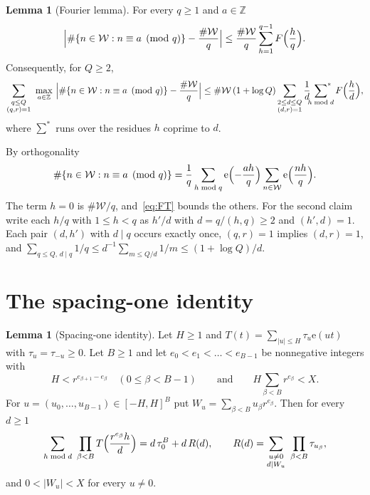 \documentclass[11pt]{amsart}
\makeatletter
\theoremstyle{definition}
\newtheorem{lemma}[theorem]{Lemma}
\numberwithin{equation}{section}
\renewenvironment{proof}[1][\proofname]{\par\pushQED{\qed}\normalfont\topsep6\p@\@plus6\p@\relax\trivlist\item[\hskip\labelsep\upshape#1.]\ignorespaces}{\popQED\endtrivlist\@endpefalse}
\newcommand{\e}{\mathrm{e}}
\newcommand{\Z}{\mathbb{Z}}
\newcommand{\WW}{\mathcal{W}}
\newcommand{\sumstar}{\sideset{}{^*}\sum}
\makeatother
\begin{document}
\begin{lemma}[Fourier lemma]\label{lem:fourier}
For every $q\ge1$ and $a\in\Z$
\[
\Bigl|\#\{n\in\WW:n\equiv a\pmod q\}-\frac{\#\WW}{q}\Bigr|\le\frac{\#\WW}{q}\sum_{h=1}^{q-1}F\Bigl(\frac hq\Bigr).
\]
Consequently, for $Q\ge2$,
\[
\sum_{\substack{q\le Q\\(q,r)=1}}\ \max_{a\in\Z}\ \Bigl|\#\{n\in\WW:n\equiv a\pmod q\}-\frac{\#\WW}{q}\Bigr|\le\#\WW\,(1+\log Q)\sum_{\substack{2\le d\le Q\\(d,r)=1}}\frac1d\sumstar_{h\bmod d}F\Bigl(\frac hd\Bigr),
\]
where $\sum^*$ runs over the residues $h$ coprime to $d$.
\end{lemma}

\begin{proof}
By orthogonality
\[
\#\{n\in\WW:n\equiv a\pmod q\}=\frac1q\sum_{h\bmod q}\e\Bigl(-\frac{ah}q\Bigr)\sum_{n\in\WW}\e\Bigl(\frac{nh}q\Bigr).
\]
The term $h=0$ is $\#\WW/q$, and~\eqref{eq:FT} bounds the others. For the second claim write each $h/q$ with $1\le h<q$ as $h'/d$ with $d=q/(h,q)\ge2$ and $(h',d)=1$. Each pair $(d,h')$ with $d\mid q$ occurs exactly once, $(q,r)=1$ implies $(d,r)=1$, and $\sum_{q\le Q,\,d\mid q}1/q\le d^{-1}\sum_{m\le Q/d}1/m\le(1+\log Q)/d$.
\end{proof}

\section{The spacing-one identity}\label{sec:identity}

\begin{lemma}[Spacing-one identity]\label{lem:identity}
Let $H\ge1$ and $T(t)=\sum_{\lvert u\rvert\le H}\tau_u\e(ut)$ with $\tau_u=\tau_{-u}\ge0$. Let $B\ge1$ and let $e_0<e_1<\dots<e_{B-1}$ be nonnegative integers with
\begin{equation}\label{eq:gap}
H<r^{e_{\beta+1}-e_\beta}\quad(0\le\beta<B-1)\qquad\text{and}\qquad H\sum_{\beta<B}r^{e_\beta}<X.
\end{equation}
For $u=(u_0,\dots,u_{B-1})\in[-H,H]^B$ put $W_u=\sum_{\beta<B}u_\beta r^{e_\beta}$. Then for every $d\ge1$
\begin{equation}\label{eq:identity}
\sum_{h\bmod d}\ \prod_{\beta<B}T\Bigl(\frac{r^{e_\beta}h}{d}\Bigr)=d\,\tau_0^B+d\,R(d),\qquad R(d)=\sum_{\substack{u\ne0\\d\mid W_u}}\ \prod_{\beta<B}\tau_{u_\beta},
\end{equation}
and $0<\lvert W_u\rvert<X$ for every $u\ne0$.
\end{lemma}
\end{document}
